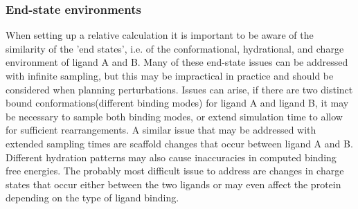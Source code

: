 \documentclass[9pt,bestpractices]{livecoms}
\begin{document}
\subsubsection{End-state environments}
When setting up a relative calculation it is important to be aware of the similarity of the 'end states', i.e. of the conformational, hydrational, and charge environment of ligand A and B. Many of these end-state issues can be addressed with infinite sampling, but this may be impractical in practice and should be considered when planning perturbations. Issues can arise, if there are two distinct bound conformations(different binding modes) for ligand A and ligand B, it may be necessary to sample both binding modes, or extend simulation time to allow for sufficient rearrangements. A similar issue that may be addressed with extended sampling times are scaffold changes that occur between ligand A and B. Different hydration patterns may also cause inaccuracies in computed binding free energies. The probably most difficult issue to address are changes in charge states that occur either between the two ligands or may even affect the protein depending on the type of ligand binding. 
\end{document}
